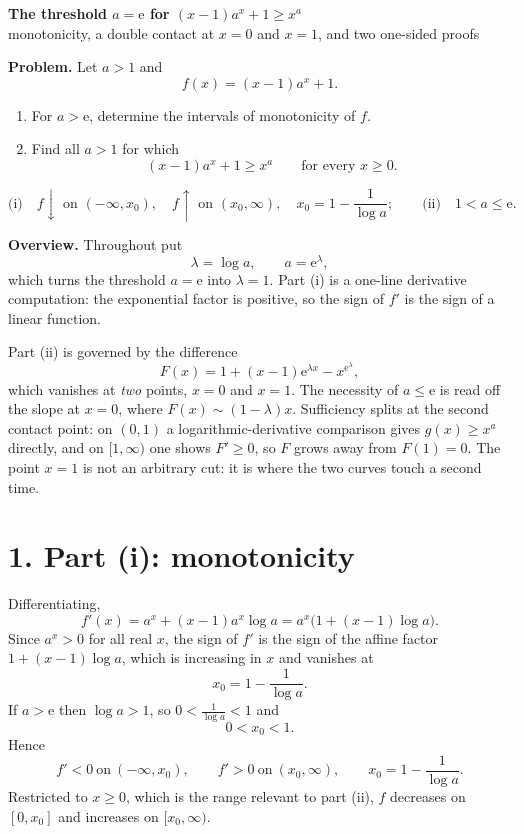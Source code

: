 \documentclass[12pt]{article}
\newcommand{\e}{\mathrm{e}}
\newcommand{\LL}{\lambda}
\begin{document}
\begin{center}
{\Large\bfseries The threshold \(a=\mathrm e\) for \((x-1)a^x+1\ge x^a\)}\\[0.35em]
{\large monotonicity, a double contact at \(x=0\) and \(x=1\), and two one-sided proofs}
\end{center}

\textbf{Problem.} Let \(a>1\) and
\[
f(x)=(x-1)a^x+1 .
\]
\begin{enumerate}
\item[(i)] For \(a>\e\), determine the intervals of monotonicity of \(f\).
\item[(ii)] Find all \(a>1\) for which
\[
(x-1)a^x+1\ge x^a\qquad\text{for every }x\ge0 .
\]
\end{enumerate}

\[
\boxed{\displaystyle
\text{(i)}\quad
f\downarrow\text{ on }(-\infty,x_0),\quad f\uparrow\text{ on }(x_0,\infty),
\quad x_0=1-\frac1{\log a};
\qquad
\text{(ii)}\quad 1<a\le\e .}
\]

\textbf{Overview.}
Throughout put
\[
\LL=\log a,\qquad a=\e^{\LL},
\]
which turns the threshold \(a=\e\) into \(\LL=1\). Part (i) is a
one-line derivative computation: the exponential factor is positive, so
the sign of \(f'\) is the sign of a linear function.

Part (ii) is governed by the difference
\[
F(x)=1+(x-1)\e^{\LL x}-x^{\e^{\LL}},
\]
which vanishes at \emph{two} points, \(x=0\) and \(x=1\). The necessity
of \(a\le\e\) is read off the slope at \(x=0\), where
\(F(x)\sim(1-\LL)x\). Sufficiency splits at the second contact point:
on \((0,1)\) a logarithmic-derivative comparison gives \(g(x)\ge x^a\)
directly, and on \([1,\infty)\) one shows \(F'\ge0\), so \(F\) grows away
from \(F(1)=0\). The point \(x=1\) is not an arbitrary cut: it is where
the two curves touch a second time.

\section*{1. Part (i): monotonicity}

Differentiating,
\[
f'(x)=a^x+(x-1)a^x\log a=a^x\bigl(1+(x-1)\log a\bigr).
\tag{1}
\]
Since \(a^x>0\) for all real \(x\), the sign of \(f'\) is the sign of the
affine factor \(1+(x-1)\log a\), which is increasing in \(x\) and
vanishes at
\[
x_0=1-\frac1{\log a}.
\tag{2}
\]
If \(a>\e\) then \(\log a>1\), so \(0<\frac1{\log a}<1\) and
\[
0<x_0<1 .
\]
Hence
\[
\boxed{\displaystyle
f'<0\ \text{on}\ (-\infty,x_0),\qquad
f'>0\ \text{on}\ (x_0,\infty),\qquad
x_0=1-\frac1{\log a}.}
\]
Restricted to \(x\ge0\), which is the range relevant to part (ii),
\(f\) decreases on \([0,x_0]\) and increases on \([x_0,\infty)\).
\end{document}
